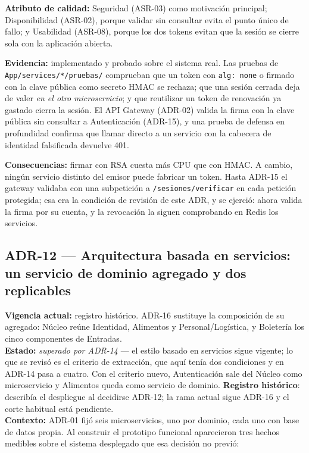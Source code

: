 \documentclass[11pt,a4paper]{article}
\begin{document}
\textbf{Atributo de calidad:} Seguridad (ASR-03) como motivación principal; Disponibilidad (ASR-02),
porque validar sin consultar evita el punto único de fallo; y Usabilidad (ASR-08), porque los dos
tokens evitan que la sesión se cierre sola con la aplicación abierta.

\textbf{Evidencia:} implementado y probado sobre el sistema real. Las pruebas de
\texttt{App/services/*/pruebas/} comprueban que un token con \texttt{alg: none} o firmado con la
clave pública como secreto HMAC se rechaza; que una sesión cerrada deja de valer \textit{en el otro
microservicio}; y que reutilizar un token de renovación ya gastado cierra la sesión. El API Gateway
(ADR-02) valida la firma con la clave pública sin consultar a Autenticación (ADR-15), y una prueba
de defensa en profundidad confirma que llamar directo a un servicio con la cabecera de identidad
falsificada devuelve 401.

\textbf{Consecuencias:} firmar con RSA cuesta más CPU que con HMAC. A cambio, ningún servicio
distinto del emisor puede fabricar un token. Hasta ADR-15 el gateway validaba con una subpetición a
\texttt{/sesiones/verificar} en cada petición protegida; esa era la condición de revisión de este
ADR, y se ejerció: ahora valida la firma por su cuenta, y la revocación la siguen comprobando en
Redis los servicios.

\subsection*{ADR-12 --- Arquitectura basada en servicios: un servicio de dominio agregado y dos replicables}
\textbf{Vigencia actual:} registro histórico. ADR-16 sustituye la composición de su agregado: Núcleo reúne Identidad, Alimentos y Personal/Logística, y Boletería los cinco componentes de Entradas.\\

\textbf{Estado:} \textit{superado por ADR-14} --- el estilo basado en servicios sigue vigente; lo que
se revisó es el criterio de extracción, que aquí tenía dos condiciones y en ADR-14 pasa a cuatro. Con
el criterio nuevo, Autenticación sale del Núcleo como microservicio y Alimentos queda como servicio de
dominio. \textbf{Registro histórico}: describía el despliegue al decidirse ADR-12; la rama actual sigue ADR-16 y el corte habitual está pendiente.\\
\textbf{Contexto:} ADR-01 fijó seis microservicios, uno por dominio, cada uno con base de datos
propia. Al construir el prototipo funcional aparecieron tres hechos medibles sobre el sistema
desplegado que esa decisión no previó:
\end{document}
